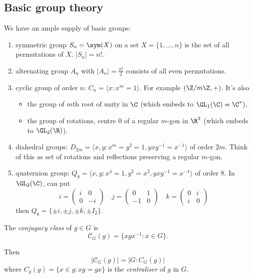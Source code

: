 \documentclass[a4paper]{article}
\newcommand{\ccl}{{\mathcal C}}
\begin{document}
\subsection{Basic group theory}

We have an ample supply of basic groups:
\begin{enumerate}
\item symmetric group \(S_n = \sym(X)\) on a set \(X = \{1, \dots, n\}\) is the set of all permutations of \(X\). \(|S_n| = n!\).
\item alternating group \(A_n\) with \(|A_n| = \frac{n!}{2}\) consists of all even permutations.
\item cyclic group of order \(n\): \(C_n = \langle x: x^m = 1\rangle\). For example \((\Z/m\Z, +)\). It's also
  \begin{itemize}
  \item the group of \(m\)th root of unity in \(\C\) (which embeds to \(\GL_1(\C) = \C^*\)),
  \item the group of rotations, centre \(0\) of a regular \(m\)-gon in \(\R^2\) (which embeds to \(\GL_2(\R)\)).
  \end{itemize}
\item diahedral groups: \(D_{2m} = \langle x, y: x^m = y^2 = 1, yxy^{-1} = x^{-1} \rangle\) of order \(2m\). Think of this as set of rotations and reflections preserving a regular \(m\)-gon.
\item quaternion group: \(Q_8 = \langle x, y: x^4 = 1, y^2 = x^2, yxy^{-1} = x^{-1} \rangle\) of order \(8\). In \(\GL_2(\C)\), can put
  \[
    i =
    \begin{pmatrix}
      i & 0 \\
      0 & -i
    \end{pmatrix}
    \quad
    j =
    \begin{pmatrix}
      0 & 1 \\
      -1 & 0
    \end{pmatrix}
    \quad
     k =
    \begin{pmatrix}
      0 & i \\
      i & 0
    \end{pmatrix}
  \]
  then \(Q_8 = \{\pm i, \pm j, \pm k, \pm I_2\}\).
\end{enumerate}

\begin{definition}
  The \emph{conjugacy class} of \(g \in G\) is
  \[
    \ccl_G(g) = \{xgx^{-1}: x \in G\}.
  \]

  Then
  \[
    |\ccl_G(g)| = |G: C_G(g)|
  \]
  where \(C_g(g) = \{x \in g: xg = gx\}\) is the \emph{centraliser} of \(g\) in \(G\).
\end{definition}
\end{document}
